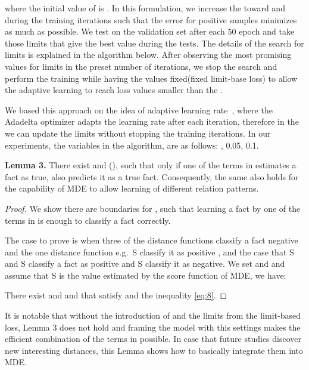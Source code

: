 \documentclass{ecai}
\begin{document}
where the initial value of  is .  In this formulation, we increase the  toward  and  during the training iterations such that the error for positive samples minimizes as much as possible.
We test on the validation set after each 50 epoch and take those limits that give the best value during the tests. The details of the search for limits is explained in the algorithm below. 
After observing the most promising values for limits in the preset number of iterations, we stop the search and perform the training while having the  values fixed(fixed limit-base loss) to allow the adaptive learning to reach loss values smaller than the .



We based this approach on the idea of adaptive learning rate~\cite{zeiler2012adadelta}, where the Adadelta optimizer adapts the learning rate after each iteration, therefore in the  we can update the limits without stopping the training iterations. In our experiments, the variables in the algorithm, are as follows: ,  0.05,  0.1. 
\begin{algorithmic}[1]
		    \State {{}}
    		\State {{}}
	    	\State {{}}
\If{ } 
		        \State {{}}
	        	\If{ } 
	        	\State{{}}
			    \EndIf
		    \EndIf
\EndIf
\EndIf
	\end{algorithmic}








\textbf{Lemma 3.} There exist  and  (), such that only if one of the terms in  estimates a fact as true,  also predicts it as a true fact. Consequently, the same also holds for the capability of MDE to allow learning of different relation patterns.

\begin{proof} We show there are boundaries for , such that learning a fact by one of the terms in  is enough to classify a fact correctly. 

The case to prove is when three of the distance functions classify a fact negative  and the one distance function e.g.\ S classify it as positive , and the case that S and S classify a fact as positive and S classify it as negative. We set  and   and assume that S is the value estimated by the score function of MDE, we have:



There exist  and  and  that satisfy  and the inequality \ref{eq:8}.
\end{proof}
It is notable that without the introduction of  and the limits  from the limit-based loss, Lemma 3 does not hold and framing the model with this settings makes the efficient combination of the terms in  possible. In case that future studies discover new interesting distances, this Lemma shows how to basically integrate them into MDE.
\end{document}
